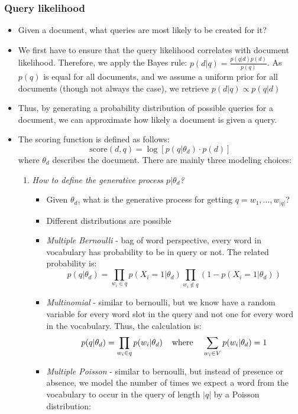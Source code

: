 \subsubsection{Query likelihood}
\begin{itemize}
	\item Given a document, what queries are most likely to be created for it? 
	\item We first have to ensure that the query likelihood correlates with document likelihood. Therefore, we apply the Bayes rule: $p(d|q) = \frac{p(q|d)p(d)}{p(q)}$. As $p(q)$ is equal for all documents, and we assume a uniform prior for all documents (though not always the case), we retrieve $p(d|q)\propto p(q|d)$
	\item Thus, by generating a probability distribution of possible queries for a document, we can approximate how likely a document is given a query.
	\item The scoring function is defined as follows:
	$$\text{score}(d,q) = \log \left[p(q|\theta_d)\cdot p(d)\right]$$
	where $\theta_d$ describes the document. There are mainly three modeling choices:
	\begin{enumerate}
		\item \textit{How to define the generative process $p|\theta_d$?}
		\begin{itemize}
			\item Given $\theta_d$, what is the generative process for getting $q=w_1,...,w_{|q|}$?
			\item Different distributions are possible
			\item \textit{Multiple Bernoulli} - bag of word perspective, every word in vocabulary has probability to be in query or not. The related probability is:
			$$p(q|\theta_d) = \prod\limits_{w_i \in q} p(X_i = 1 | \theta_d) \prod\limits_{w_i \not\in q} \left(1 - p\left(X_i = 1 | \theta_d\right) \right)$$
			\item \textit{Multinomial} - similar to bernoulli, but we know have a random variable for every word slot in the query and not one for every word in the vocabulary. Thus, the calculation is:
			$$p(q|\theta_d) = \prod\limits_{w_i \in q} p(w_i | \theta_d) \text{\hspace{4mm}where\hspace{4mm}} \sum\limits_{w_i \in V} p(w_i|\theta_d) = 1$$
			\item \textit{Multiple Poisson} - similar to bernoulli, but instead of presence or absence, we model the number of times we expect a word from the vocabulary to occur in the query of length $|q|$ by a Poisson distribution:

\end{itemize}
\end{enumerate}
\end{itemize}
